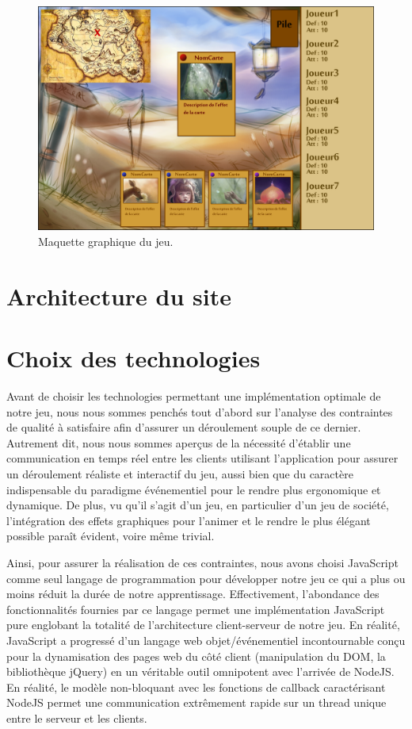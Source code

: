 \documentclass[12pt]{report}
\begin{document}
    \begin{figure}[h!]
    	\centering
	    \includegraphics[scale=2.8]{mock-up.png}
	    \caption{Maquette graphique du jeu.}
	    \label{fig:maquette}
    \end{figure}


    \section{Architecture du site}

    \section{Choix des technologies}
		Avant de choisir les technologies permettant une implémentation optimale de notre jeu, nous nous sommes penchés tout d'abord sur l'analyse des contraintes de qualité à satisfaire afin d'assurer un déroulement souple de ce dernier. Autrement dit, nous nous sommes aperçus de la nécessité d'établir une communication en temps réel entre les clients utilisant l'application pour assurer un déroulement réaliste et interactif du jeu, aussi bien que du caractère indispensable du paradigme événementiel pour le rendre plus ergonomique et dynamique. De plus, vu qu'il s'agit d'un jeu, en particulier d'un jeu de société, l'intégration des effets graphiques pour l'animer et le rendre le plus élégant possible paraît évident, voire même trivial.

		Ainsi, pour assurer la réalisation de ces contraintes, nous avons choisi JavaScript comme seul langage de programmation pour développer notre jeu ce qui a plus ou moins réduit la durée de notre apprentissage. Effectivement, l'abondance des fonctionnalités fournies par ce langage permet une implémentation JavaScript pure englobant la totalité de l'architecture client-serveur de notre jeu. En réalité, JavaScript a progressé d'un langage web objet/événementiel incontournable conçu pour la dynamisation des pages web du côté client (manipulation du DOM, la bibliothèque jQuery) en un véritable outil omnipotent avec l'arrivée de NodeJS. En réalité, le modèle non-bloquant avec les fonctions de callback caractérisant NodeJS permet une communication extrêmement rapide sur un thread unique entre le serveur et les clients.
\end{document}
